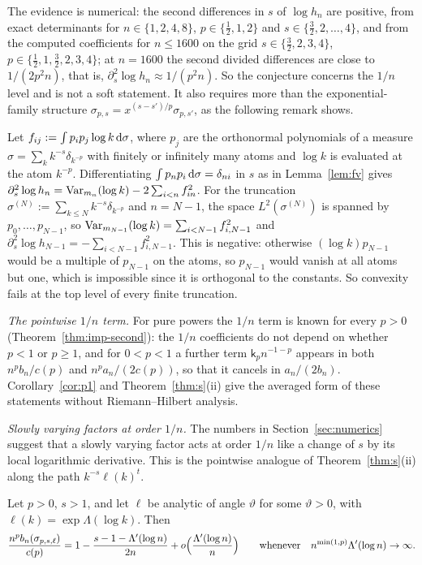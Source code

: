 The evidence is numerical: the second differences in $s$ of $\log h_n$ are positive, from exact determinants for
$n\in\{1,2,4,8\}$, $p\in\{\frac12,1,2\}$ and $s\in\{\frac32,2,\dots,4\}$, and from the computed coefficients for $n\le1600$
on the grid $s\in\{\frac32,2,3,4\}$, $p\in\{\frac12,1,\frac32,2,3,4\}$; at $n=1600$ the second divided differences are
close to $1/(2p^2n)$, that is, $\partial_s^2\log h_n\approx1/(p^2n)$. So the conjecture concerns the $1/n$ level and is not a soft statement. It also requires more than
the exponential-family structure $\sigma_{p,s}=x^{(s-s')/p}\sigma_{p,s'}$, as the following remark shows.

\begin{remark}\label{rem:cvx-fin}
Let $f_{ij}:=\int p_ip_j\log k\,\mathrm{d}\sigma$, where $p_j$ are the orthonormal polynomials of a measure
$\sigma=\sum_kk^{-s}\delta_{k^{-p}}$ with finitely or infinitely many atoms and $\log k$ is evaluated at the atom $k^{-p}$.
Differentiating $\int p_np_i\,\mathrm{d}\sigma=\delta_{ni}$ in $s$ as in Lemma~\ref{lem:fv} gives
$\partial_s^2\log h_n=\operatorname{Var}_{m_n}(\log k)-2\sum_{i<n}f_{in}^2$. For the truncation $\sigma^{(N)}:=\sum_{k\le N}k^{-s}\delta_{k^{-p}}$
and $n=N-1$, the space $L^2(\sigma^{(N)})$ is spanned by $p_0,\dots,p_{N-1}$, so
$\operatorname{Var}_{m_{N-1}}(\log k)=\sum_{i<N-1}f_{i,N-1}^2$ and $\partial_s^2\log h_{N-1}=-\sum_{i<N-1}f_{i,N-1}^2$. This is negative:
otherwise $(\log k)p_{N-1}$ would be a multiple of $p_{N-1}$ on the atoms, so $p_{N-1}$ would vanish at
all atoms but one, which is impossible since it is orthogonal to the constants. So convexity fails at the top level of
every finite truncation.
\end{remark}

\emph{The pointwise $1/n$ term.} For pure powers the $1/n$ term is known for every $p>0$
(Theorem~\ref{thm:imp-second}): the $1/n$ coefficients do not depend on whether $p<1$ or $p\ge1$, and for $0<p<1$ a
further term $\mathsf k_pn^{-1-p}$ appears in both $n^pb_n/c(p)$ and $n^pa_n/(2c(p))$, so that it cancels in
$a_n/(2b_n)$. Corollary~\ref{cor:p1} and Theorem~\ref{thm:s}(ii) give the averaged form of these statements
without Riemann--Hilbert analysis.

\emph{Slowly varying factors at order $1/n$.} The numbers in Section~\ref{sec:numerics} suggest that a slowly varying
factor acts at order $1/n$ like a change of $s$ by its local logarithmic derivative. This is the pointwise analogue of
Theorem~\ref{thm:s}(ii) along the path $k^{-s}\ell(k)^t$.

\begin{conjecture}\label{conj:tilt}
Let $p>0$, $s>1$, and let $\ell$ be analytic of angle $\vartheta$ for some $\vartheta>0$, with
$\ell(k)=\exp\Lambda(\log k)$. Then
\[
  \frac{n^pb_n(\sigma_{p,s,\ell})}{c(p)}=1-\frac{s-1-\Lambda'(\log n)}{2n}+o\Bigl(\frac{\Lambda'(\log n)}{n}\Bigr)
  \qquad\text{whenever}\quad n^{\min(1,p)}\Lambda'(\log n)\to\infty.
\]
\end{conjecture}

